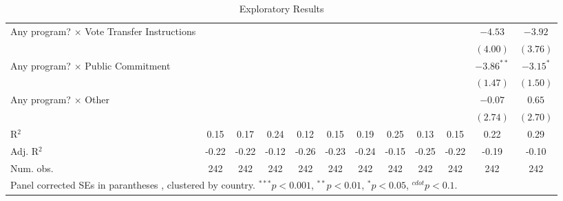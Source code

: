 \begin{sidewaystable}
\begin{center}
{\begin{tabular}{l c c c c c c c c c c c }
Any program? $\times$ Vote Transfer Instructions   &              &                 &                 &                 &              &              &              &                 &              & $-4.53$         & $-3.92$         \\
                                                   &              &                 &                 &                 &              &              &              &                 &              & $(4.00)$        & $(3.76)$        \\
Any program? $\times$ Public Commitment            &              &                 &                 &                 &              &              &              &                 &              & $-3.86^{**}$    & $-3.15^{*}$     \\
                                                   &              &                 &                 &                 &              &              &              &                 &              & $(1.47)$        & $(1.50)$        \\
Any program? $\times$ Other                        &              &                 &                 &                 &              &              &              &                 &              & $-0.07$         & $0.65$          \\
                                                   &              &                 &                 &                 &              &              &              &                 &              & $(2.74)$        & $(2.70)$        \\
\midrule
R$^2$                                              & 0.15         & 0.17            & 0.24            & 0.12            & 0.15         & 0.19         & 0.25         & 0.13            & 0.15         & 0.22            & 0.29            \\
Adj. R$^2$                                         & -0.22        & -0.22           & -0.12           & -0.26           & -0.23        & -0.24        & -0.15        & -0.25           & -0.22        & -0.19           & -0.10           \\
Num. obs.                                          & 242          & 242             & 242             & 242             & 242          & 242          & 242          & 242             & 242          & 242             & 242             \\
\bottomrule
\multicolumn{12}{l}{\scriptsize{Panel corrected SEs in parantheses \cite{Beck.1995}, clustered by country. $^{***}p<0.001$, $^{**}p<0.01$, $^*p<0.05$, $^{cdot}p<0.1$.}}
\end{tabular}
}
\caption{Exploratory Results}
\label{tbl:ExploratoryResults}
\end{center}
\end{sidewaystable}
